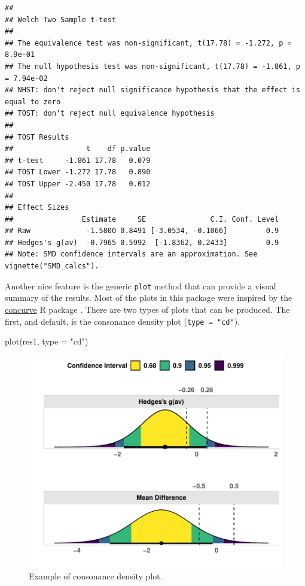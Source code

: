 \documentclass[]{interact}
\theoremstyle{plain}%
\theoremstyle{definition}
\theoremstyle{remark}
\newenvironment{Shaded}{\begin{snugshade}}{\end{snugshade}}
\newcommand{\AttributeTok}[1]{\textcolor[rgb]{0.77,0.63,0.00}{#1}}
\newcommand{\FunctionTok}[1]{\textcolor[rgb]{0.00,0.00,0.00}{#1}}
\newcommand{\NormalTok}[1]{#1}
\newcommand{\StringTok}[1]{\textcolor[rgb]{0.31,0.60,0.02}{#1}}
\begin{document}
\begin{verbatim}
## 
## Welch Two Sample t-test
## 
## The equivalence test was non-significant, t(17.78) = -1.272, p = 8.9e-01
## The null hypothesis test was non-significant, t(17.78) = -1.861, p = 7.94e-02
## NHST: don't reject null significance hypothesis that the effect is equal to zero 
## TOST: don't reject null equivalence hypothesis
## 
## TOST Results 
##                 t    df p.value
## t-test     -1.861 17.78   0.079
## TOST Lower -1.272 17.78   0.890
## TOST Upper -2.450 17.78   0.012
## 
## Effect Sizes 
##                Estimate     SE               C.I. Conf. Level
## Raw             -1.5800 0.8491 [-3.0534, -0.1066]         0.9
## Hedges's g(av)  -0.7965 0.5992  [-1.8362, 0.2433]         0.9
## Note: SMD confidence intervals are an approximation. See vignette("SMD_calcs").
\end{verbatim}

\newpage

Another nice feature is the generic \texttt{plot} method that can
provide a visual summary of the results. Most of the plots in this
package were inspired by the
\href{https://cran.r-project.org/package=concurve}{concurve} R package
\citep{rafi2020}. There are two types of plots that can be produced. The
first, and default, is the consonance density plot
(\texttt{type\ =\ "cd"}).

\begin{Shaded}
\begin{Highlighting}[]
\FunctionTok{plot}\NormalTok{(res1, }\AttributeTok{type =} \StringTok{"cd"}\NormalTok{)}
\end{Highlighting}
\end{Shaded}

\begin{figure}
\centering
\includegraphics{Avocado_Update_files/figure-latex/cdplot-1.pdf}
\caption{Example of consonance density plot.}
\end{figure}
\end{document}
